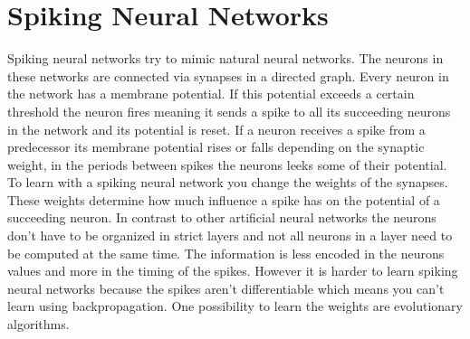 \section{Spiking Neural Networks}
Spiking neural networks try to mimic natural neural networks.
The neurons in these networks are connected via synapses in a directed graph.
Every neuron in the network has a membrane potential.
If this potential exceeds a certain threshold the neuron fires meaning it sends a spike to all its succeeding neurons in the network and its potential is reset.
If a neuron receives a spike from a predecessor its membrane potential rises or falls depending on the synaptic weight, in the periods between spikes the neurons leeks some of their potential.
To learn with a spiking neural network you change the weights of the synapses.
These weights determine how much influence a spike has on the potential of a succeeding neuron.
In contrast to other artificial neural networks the neurons don't have to be organized in strict layers and not all neurons in a layer need to be computed at the same time.
The information is less encoded in the neurons values and more in the timing of the spikes.
However it is harder to learn spiking neural networks because the spikes aren't differentiable which means you can't learn using backpropagation.
One possibility to learn the weights are evolutionary algorithms.